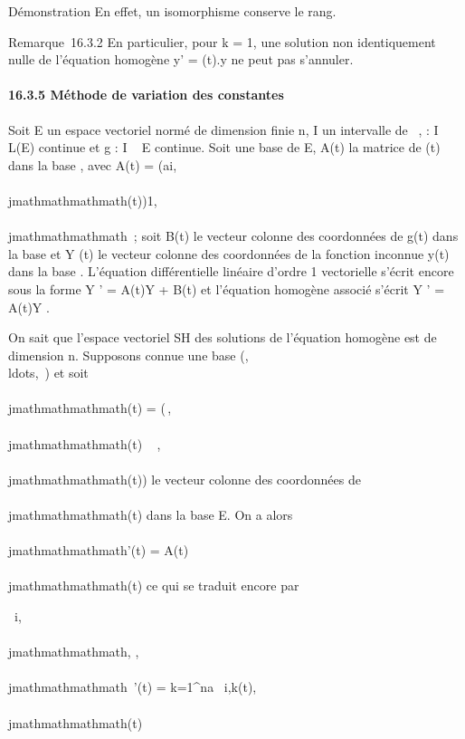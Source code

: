 Démonstration En effet, un isomorphisme conserve le rang.

Remarque~16.3.2 En particulier, pour k = 1, une solution non
identiquement nulle de l'équation homogène y' = \ell(t).y ne peut pas
s'annuler.

\paragraph{16.3.5 Méthode de variation des constantes}

Soit E un espace vectoriel normé de dimension finie n, I un intervalle
de ~, \ell : I \rightarrow~ L(E) continue et g : I \rightarrow~ E continue. Soit  une base de E,
A(t) la matrice de \ell(t) dans la base , avec A(t) =
(ai,\\\\jmathmathmathmath(t))1\leqi,\\\\jmathmathmathmath\leqn~; soit B(t) le vecteur colonne des
coordonnées de g(t) dans la base  et Y (t) le vecteur colonne des
coordonnées de la fonction inconnue y(t) dans la base . L'équation
différentielle linéaire d'ordre 1 vectorielle s'écrit encore sous la
forme Y ' = A(t)Y + B(t) et l'équation homogène associé s'écrit Y ' =
A(t)Y .

On sait que l'espace vectoriel SH des solutions de l'équation
homogène est de dimension n. Supposons connue une base
(,\\ldots,\phin~)
et soit \Phi\\\\jmathmathmathmath(t) = \left
(\matrix\,,\\\\jmathmathmathmath(t)
\cr \⋮~
\cr \phin,\\\\jmathmathmathmath(t)\right ) le vecteur
colonne des coordonnées de \phi\\\\jmathmathmathmath(t) dans la base E. On a alors
\Phi\\\\jmathmathmathmath'(t) = A(t)\Phi\\\\jmathmathmathmath(t) ce qui se traduit encore par

\forall~i,\\\\jmathmathmathmath, \phii,\\\\jmathmathmathmath~'(t) =
\sum k=1^na~
i,k(t)\psik,\\\\jmathmathmathmath(t)

